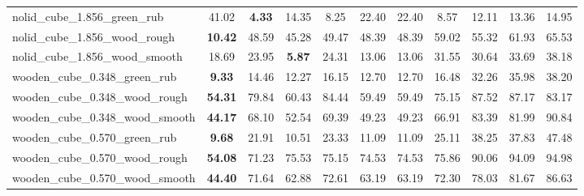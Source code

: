 \begin{table}[H]
{\begin{tabular}{l cccccccccc}
        nolid\_cube\_1.856\_green\_rub & 41.02 & \textbf{4.33} & 14.35 & 8.25 & 22.40 & 22.40 & 8.57 & 12.11 & 13.36 & 14.95 \\
        nolid\_cube\_1.856\_wood\_rough & \textbf{10.42} & 48.59 & 45.28 & 49.47 & 48.39 & 48.39 & 59.02 & 55.32 & 61.93 & 65.53 \\
        nolid\_cube\_1.856\_wood\_smooth & 18.69 & 23.95 & \textbf{5.87} & 24.31 & 13.06 & 13.06 & 31.55 & 30.64 & 33.69 & 38.18 \\
        wooden\_cube\_0.348\_green\_rub & \textbf{9.33} & 14.46 & 12.27 & 16.15 & 12.70 & 12.70 & 16.48 & 32.26 & 35.98 & 38.20 \\
        wooden\_cube\_0.348\_wood\_rough & \textbf{54.31} & 79.84 & 60.43 & 84.44 & 59.49 & 59.49 & 75.15 & 87.52 & 87.17 & 83.17 \\
        wooden\_cube\_0.348\_wood\_smooth & \textbf{44.17} & 68.10 & 52.54 & 69.39 & 49.23 & 49.23 & 66.91 & 83.39 & 81.99 & 90.84 \\
        wooden\_cube\_0.570\_green\_rub & \textbf{9.68} & 21.91 & 10.51 & 23.33 & 11.09 & 11.09 & 25.11 & 38.25 & 37.83 & 47.48 \\
        wooden\_cube\_0.570\_wood\_rough & \textbf{54.08} & 71.23 & 75.53 & 75.15 & 74.53 & 74.53 & 75.86 & 90.06 & 94.09 & 94.98 \\
        wooden\_cube\_0.570\_wood\_smooth & \textbf{44.40} & 71.64 & 62.88 & 72.61 & 63.19 & 63.19 & 72.30 & 78.03 & 81.67 & 86.63 \\
        \bottomrule
    \end{tabular}
    }
\end{table}
